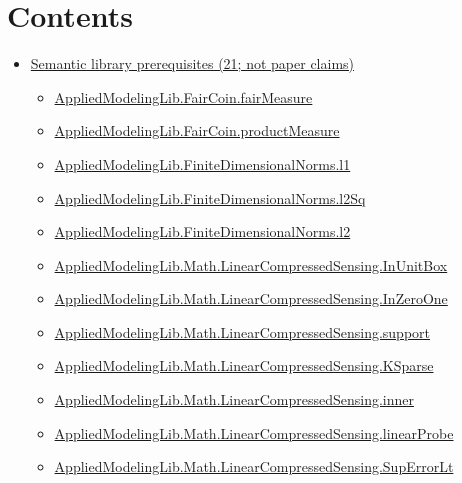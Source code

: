 \documentclass[10pt]{article}
\begin{document}
\section*{Contents}
\begin{itemize}[leftmargin=1.2em]
\item \hyperlink{library-section-394e2d3089a4790e}{Semantic library prerequisites (21; not paper claims)}
\begin{itemize}[leftmargin=1.2em]
\item \hyperlink{library-prerequisite-3b4037efd2578d57}{AppliedModelingLib.\allowbreak{}FairCoin.\allowbreak{}fairMeasure}
\item \hyperlink{library-prerequisite-1ffe905ac568fe34}{AppliedModelingLib.\allowbreak{}FairCoin.\allowbreak{}productMeasure}
\item \hyperlink{library-prerequisite-3d99a970244a38c7}{AppliedModelingLib.\allowbreak{}FiniteDimensionalNorms.\allowbreak{}l1}
\item \hyperlink{library-prerequisite-634c9de2aa959a7a}{AppliedModelingLib.\allowbreak{}FiniteDimensionalNorms.\allowbreak{}l2Sq}
\item \hyperlink{library-prerequisite-08313452edb53fe9}{AppliedModelingLib.\allowbreak{}FiniteDimensionalNorms.\allowbreak{}l2}
\item \hyperlink{library-prerequisite-c35e4379972ea6a7}{AppliedModelingLib.\allowbreak{}Math.\allowbreak{}LinearCompressedSensing.\allowbreak{}InUnitBox}
\item \hyperlink{library-prerequisite-6acf02dccc761051}{AppliedModelingLib.\allowbreak{}Math.\allowbreak{}LinearCompressedSensing.\allowbreak{}InZeroOne}
\item \hyperlink{library-prerequisite-e73f6892dab51ea6}{AppliedModelingLib.\allowbreak{}Math.\allowbreak{}LinearCompressedSensing.\allowbreak{}support}
\item \hyperlink{library-prerequisite-16b52186f2356e0f}{AppliedModelingLib.\allowbreak{}Math.\allowbreak{}LinearCompressedSensing.\allowbreak{}KSparse}
\item \hyperlink{library-prerequisite-80b8245a943a9126}{AppliedModelingLib.\allowbreak{}Math.\allowbreak{}LinearCompressedSensing.\allowbreak{}inner}
\item \hyperlink{library-prerequisite-3c53e0c4df04cc38}{AppliedModelingLib.\allowbreak{}Math.\allowbreak{}LinearCompressedSensing.\allowbreak{}linearProbe}
\item \hyperlink{library-prerequisite-42ffb876520532f3}{AppliedModelingLib.\allowbreak{}Math.\allowbreak{}LinearCompressedSensing.\allowbreak{}SupErrorLt}

\end{itemize}
\end{itemize}
\end{document}
